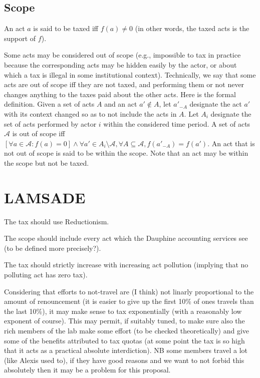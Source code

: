\documentclass[version=3.21, pagesize, twoside=off, bibliography=totoc, DIV=calc, fontsize=12pt, a4paper, french, english]{scrartcl}
\begin{document}
\subsection{Scope}
An act $a$ is said to be taxed iff $f(a) ≠ 0$ (in other words, the taxed acts is the support of $f$).

Some acts may be considered out of scope (e.g., impossible to tax in practice because the corresponding acts may be hidden easily by the actor, or about which a tax is illegal in some institutional context). Technically, we say that some acts are out of scope iff they are not taxed, and performing them or not never changes anything to the taxes paid about the other acts. Here is the formal definition. Given a set of acts $A$ and an act $a' \notin A$, let $a'_{-A}$ designate the act $a'$ with its context changed so as to not include the acts in $A$. Let $A_i$ designate the set of acts performed by actor $i$ within the considered time period. A set of acts $\mathcal{A}$ is out of scope iff $[\forall a \in \mathcal{A}: f(a) = 0] \land \forall a' \in A_i \setminus \mathcal{A}, \forall A \subseteq \mathcal{A}, f(a'_{-A}) = f(a')$.
An act that is not out of scope is said to be within the scope. Note that an act may be within the scope but not be taxed.

\section{LAMSADE}

The tax should use Reductionism.

The scope should include every act which the Dauphine accounting services see (to be defined more precisely?).

The tax should strictly increase with increasing act pollution (implying that no polluting act has zero tax).

Considering that efforts to not-travel are (I think) not linarly proportional to the amount of renouncement (it is easier to give up the first 10\% of ones travels than the last 10\%), it may make sense to tax exponentially (with a reasonably low exponent of course). This may permit, if suitably tuned, to make sure also the rich members of the lab make some effort (to be checked theoretically) and give some of the benefits attributed to tax quotas (at some point the tax is so high that it acts as a practical absolute interdiction). NB some members travel a lot (like Alexis used to), if they have good reasons and we want to not forbid this absolutely then it may be a problem for this proposal.
\end{document}
